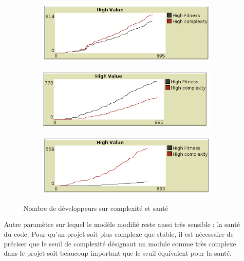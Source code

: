 \documentclass{article}
\begin{document}

\begin{figure}[H]

  \begin{subfigure}{.5\textwidth}
    \centering
    \includegraphics[width=1\linewidth]{pictures/seuil5_complexite_fitness.png}
  \end{subfigure}
  \begin{subfigure}{.5\textwidth}
    \centering
    \includegraphics[width=1\linewidth]{pictures/seuil_complexite10_fitness5.png}
  \end{subfigure}
  \begin{subfigure}{.5\textwidth}
    \centering
    \includegraphics[width=1\linewidth]{pictures/seuil_complexite5_fitness8.png}
  \end{subfigure}

  \caption{Nombre de développeurs sur complexité et santé }
\end{figure}
Autre paramètre sur lequel le modèle modifié reste aussi très sensible : la santé du code. Pour qu'un projet soit plus complexe que stable, il est nécessaire de préciser
que le seuil de complexité désignant un module comme très complexe dans le projet soit beaucoup important que le seuil équivalent pour la santé.
\end{document}
